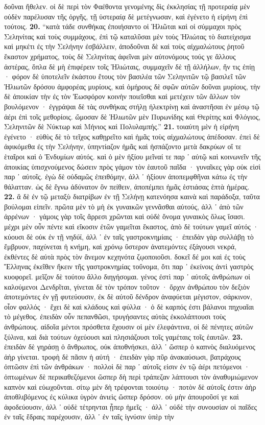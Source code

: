 \documentclass[a4paper, 11pt, oneside, polutonikogreek, german]{article}
\begin{document}
δοῦναι ἤθελεν. οἱ δὲ περὶ τὸν Φαέθοντα γενομένης δὶς ἐκκλησίας τῇ προτεραίᾳ μὲν οὐδὲν παρέλυσαν τῆς ὀργῆς, τῇ ὑστεραίᾳ δὲ μετέγνωσαν, καὶ ἐγένετο ἡ εἰρήνη ἐπὶ τούτοις. \textbf{20.} "`κατὰ τάδε συνθήκας ἐποιήσαντο οἱ Ἡλιῶται καὶ οἱ σύμμαχοι πρὸς Σεληνίτας καὶ τοὺς συμμάχους, ἐπὶ τῷ καταλῦσαι μὲν τοὺς Ἡλιώτας τὸ διατείχισμα καὶ μηκέτι ἐς τὴν Σελήνην ἐσβάλλειν, ἀποδοῦναι δὲ καὶ τοὺς αἰχμαλώτους ῥητοῦ ἕκαστον χρήματος, τοὺς δὲ Σεληνίτας ἀφεῖναι μὲν αὐτονόμους τούς γε ἄλλους ἀστέρας, ὅπλα δὲ μὴ ἐπιφέρειν τοῖς Ἡλιώταις, συμμαχεῖν δὲ τῇ ἀλλήλων, ἤν τις ἐπίῃ · φόρον δὲ ὑποτελεῖν ἑκάστου ἔτους τὸν βασιλέα τῶν Σεληνιτῶν τῷ βασιλεῖ τῶν Ἡλιωτῶν δρόσου ἀμφορέας μυρίους, καὶ ὁμήρους δὲ σφῶν αὐτῶν δοῦναι μυρίους, τὴν δὲ ἀποικίαν τὴν ἐς τὸν Ἑωσφόρον κοινὴν ποιεῖσθαι καὶ μετέχειν τῶν ἄλλων τὸν βουλόμενον · ἐγγράψαι δὲ τὰς συνθήκας στήλῃ ἠλεκτρίνῃ καὶ ἀναστῆσαι ἐν μέσῳ τῷ ἀέρι ἐπὶ τοῖς μεθορίοις. ὤμοσαν δὲ Ἡλιωτῶν μὲν Πυρωνίδης καὶ Θερίτης καὶ Φλόγιος, Σεληνιτῶν δὲ Νύκτωρ καὶ Μήνιος καὶ Πολυλαμπής."' \textbf{21.} τοιαύτη μὲν ἡ εἰρήνη ἐγένετο · εὐθὺς δὲ τὸ τεῖχος καθῃρεῖτο καὶ ἡμᾶς τοὺς αἰχμαλώτους ἀπέδοσαν. ἐπεὶ δὲ ἀφικόμεθα ἐς τὴν Σελήνην, ὑπηντίαζον ἡμᾶς καὶ ἡσπάζοντο μετὰ δακρύων οἵ τε ἑταῖροι καὶ ὁ Ἐνδυμίων αὐτός. καὶ ὁ μὲν ἠξίου μεῖναί τε παρ ᾽ αὐτῷ καὶ κοινωνεῖν τῆς ἀποικίας ὑπισχνούμενος δώσειν πρὸς γάμον τὸν ἑαυτοῦ παῖδα · γυναῖκες γὰρ οὐκ εἰσὶ παρ ᾽ αὐτοῖς. ἐγὼ δὲ οὐδαμῶς ἐπειθόμην, ἀλλ ᾽ ἠξίουν ἀποπεμφθῆναι κάτω ἐς τὴν θάλατταν. ὡς δὲ ἔγνω ἀδύνατον ὂν πείθειν, ἀποπέμπει ἡμᾶς ἑστιάσας ἑπτὰ ἡμέρας. \textbf{22.} ἃ δὲ ἐν τῷ μεταξὺ διατρίβων ἐν τῇ Σελήνῃ κατενόησα καινὰ καὶ παράδοξα, ταῦτα βούλομαι εἰπεῖν. πρῶτα μὲν τὸ μὴ ἐκ γυναικῶν γεννᾶσθαι αὐτούς, ἀλλ ᾽ ἀπὸ τῶν ἀρρένων · γάμοις γὰρ τοῖς ἄρρεσι χρῶνται καὶ οὐδὲ ὄνομα γυναικὸς ὅλως ἴσασι. μέχρι μὲν οὖν πέντε καὶ εἴκοσιν ἐτῶν γαμεῖται ἕκαστος, ἀπὸ δὲ τούτων γαμεῖ αὐτός · κύουσι δὲ οὐκ ἐν τῇ νηδύϊ, ἀλλ ᾽ ἐν ταῖς γαστροκνημίαις · ἐπειδὰν γὰρ συλλάβῃ τὸ ἔμβρυον, παχύνεται ἡ κνήμη, καὶ χρόνῳ ὕστερον ἀνατεμόντες ἐξάγουσι νεκρά, ἐκθέντες δὲ αὐτὰ πρὸς τὸν ἄνεμον κεχηνότα ζῳοποιοῦσι. δοκεῖ δέ μοι καὶ ἐς τοὺς Ἕλληνας ἐκεῖθεν ἥκειν τῆς γαστροκνημίας τοὔνομα, ὅτι παρ ᾽ ἐκείνοις ἀντὶ γαστρὸς κυοφορεῖ. μεῖζον δὲ τούτου ἄλλο διηγήσομαι. γένος ἐστὶ παρ ᾽ αὐτοῖς ἀνθρώπων οἱ καλούμενοι Δενδρῖται, γίνεται δὲ τὸν τρόπον τοῦτον · ὄρχιν ἀνθρώπου τὸν δεξιὸν ἀποτεμόντες ἐν γῇ φυτεύουσιν, ἐκ δὲ αὐτοῦ δένδρον ἀναφύεται μέγιστον, σάρκινον, οἷον φαλλός · ἔχει δὲ καὶ κλάδους καὶ φύλλα · ὁ δὲ καρπός ἐστι βάλανοι πηχυαῖαι τὸ μέγεθος. ἐπειδὰν οὖν πεπανθῶσι, τρυγήσαντες αὐτὰς ἐκκολάπτουσι τοὺς ἀνθρώπους. αἰδοῖα μέντοι πρόσθετα ἔχουσιν οἱ μὲν ἐλεφάντινα, οἱ δὲ πένητες αὐτῶν ξύλινα, καὶ διὰ τούτων ὀχεύουσι καὶ πλησιάζουσι τοῖς γαμέταις τοῖς ἑαυτῶν. \textbf{23.} ἐπειδὰν δὲ γηράσῃ ὁ ἄνθρωπος, οὐκ ἀποθνήσκει, ἀλλ ᾽ ὥσπερ ὁ καπνὸς διαλυόμενος ἀὴρ γίνεται. τροφὴ δὲ πᾶσιν ἡ αὐτή · ἐπειδὰν γὰρ πῦρ ἀνακαύσωσι, βατράχους ὀπτῶσιν ἐπὶ τῶν ἀνθράκων · πολλοὶ δὲ παρ ᾽ αὐτοῖς εἰσιν ἐν τῷ ἀέρι πετόμενοι · ὀπτωμένων δὲ περικαθεζόμενοι ὥσπερ δὴ περὶ τράπεζαν λάπτουσι τὸν ἀναθυμιώμενον καπνὸν καὶ εὐωχοῦνται. σίτῳ μὲν δὴ τρέφονται τοιούτῳ · ποτὸν δὲ αὐτοῖς ἐστιν ἀὴρ ἀποθλιβόμενος ἐς κύλικα ὑγρὸν ἀνιεὶς ὥσπερ δρόσον. οὐ μὴν ἀπουροῦσί γε καὶ ἀφοδεύουσιν, ἀλλ ᾽ οὐδὲ τέτρηνται ᾗπερ ἡμεῖς · ἀλλ ᾽ οὐδὲ τὴν συνουσίαν οἱ παῖδες ἐν ταῖς ἕδραις παρέχουσιν, ἀλλ ᾽ ἐν ταῖς ἰγνύσιν ὑπὲρ τὴν 
\end{document}
